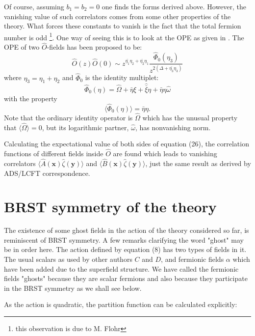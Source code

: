 \documentclass[a4paper,11pt]{article}
\begin{document}
Of course, assuming $b_1=b_2=0$ one finds the forms derived above.
However, the vanishing value of such correlators comes from some
other properties of the theory. What forces these constants to
vanish is the fact that the total fermion number is odd
\footnote{this observation is due to M. Flohr}. One way of seeing
this is to look at the OPE as given in \cite{MRSAlgeb}. The OPE
of two $\hat{O}$-fields has been proposed to be:
\begin{equation}\label{OPE}
\hat{O}(z)\hat{O}(0)\sim z^{\bar{\eta_1}\eta_2+\bar{\eta_2}\eta_1}
\frac{\hat{\Phi}_0(\eta_3)}{z^{2(\Delta+\bar{\eta_3}\eta_3)}}
\end{equation}
where $\eta_3=\eta_1+\eta_2$ and $\hat{\Phi}_0$ is
the identity multiplet:
\begin{equation}\label{Identity}
\hat{\Phi}_0(\eta)=\hat{\Omega} +
\bar{\eta}\hat{\xi}+\hat{\bar{\xi}}\eta+\bar{\eta}\eta\hat{\omega}
\end{equation}
with the property
\begin{equation}
\langle\hat{\Phi}_0(\eta)\rangle=\bar{\eta}\eta.
\end{equation}
Note that the ordinary identity operator is $\hat{\Omega}$ which
has the unusual property that $\langle\hat{\Omega}\rangle=0$, but
its logarithmic partner, $\hat{\omega}$, has nonvanishing norm.

Calculating the expectational value of both sides of equation
(26), the correlation functions of different fields inside
$\hat{O}$ are found which leads to vanishing correlators $ \langle
\hat{A}(\mathbf{x})\hat{\zeta}(\mathbf{y})\rangle $ and $\langle
\hat{B}(\mathbf{x})\hat{\zeta}(\mathbf{y}) \rangle $, just the
same result as derived by ADS/LCFT correspondence.
\section{BRST symmetry of the theory}
The existence of some ghost fields in the action of the theory
considered so far, is reminiscent of BRST symmetry. A few remarks
clarifying the word "ghost" may be in order here. The action
defined by equation (8) has two types of fields in it. The usual
scalars as used by other authors $C$ and $D$, and fermionic fields
$\alpha$ which have been added due to the superfield structure. We
have called the fermionic fields "ghosts" because they are scalar
fermions and also because they participate in the BRST symmetry
as we shall see below.

As the action is quadratic, the partition function can be
calculated explicitly:
\end{document}
